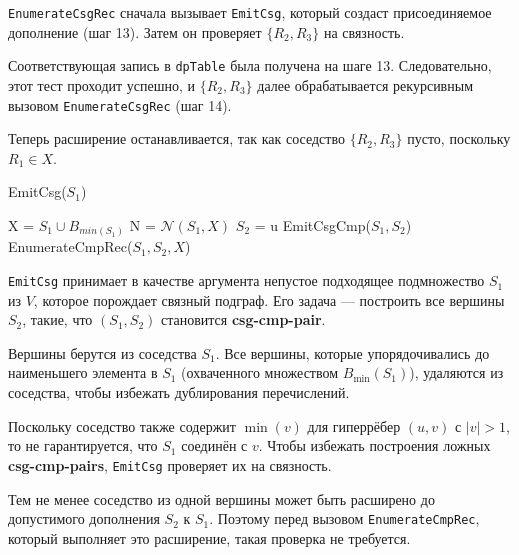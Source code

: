 \documentclass[12pt]{article}
\begin{document}
\begin{flushleft}
\texttt{EnumerateCsgRec} сначала вызывает \texttt{EmitCsg},  
который создаст присоединяемое дополнение (шаг 13).  
Затем он проверяет $\{R_2, R_3\}$ на связность.  

Соответствующая запись в \texttt{dpTable} была получена на шаге 13.  
Следовательно, этот тест проходит успешно,  
и $\{R_2, R_3\}$ далее обрабатывается рекурсивным вызовом  
\texttt{EnumerateCsgRec} (шаг 14).  

Теперь расширение останавливается, так как соседство $\{R_2, R_3\}$ пусто,  
поскольку $R_1 \in X$.  

\begin{algorithm}
    EmitCsg($S_1$)
    \begin{algorithmic}[1]
        \State X = $S_1 \cup B_{min(S_1)}$
        \State N = $\mathcal{N}(S_1, X)$
            \State $S_2$ = {u}
                \State EmitCsgCmp($S_1, S_2$)
            \EndIf
            \State EnumerateCmpRec($S_1,S_2,X$)
        \EndFor
    \end{algorithmic}
\end{algorithm}

\texttt{EmitCsg} принимает в качестве аргумента непустое подходящее подмножество $S_1$ из $V$,  
которое порождает связный подграф.  
Его задача — построить все вершины $S_2$, такие,  
что $(S_1, S_2)$ становится \textbf{csg-cmp-pair}.  

Вершины берутся из соседства $S_1$.  
Все вершины, которые упорядочивались до наименьшего элемента в $S_1$  
(охваченного множеством $B_{\min}(S_1)$), удаляются из соседства,  
чтобы избежать дублирования перечислений.  

Поскольку соседство также содержит $\min(v)$  
для гиперрёбер $(u, v)$ с $|v| > 1$,  
то не гарантируется, что $S_1$ соединён с $v$.  
Чтобы избежать построения ложных \textbf{csg-cmp-pairs},  
\texttt{EmitCsg} проверяет их на связность.  

Тем не менее соседство из одной вершины может быть расширено  
до допустимого дополнения $S_2$ к $S_1$.  
Поэтому перед вызовом \texttt{EnumerateCmpRec},  
который выполняет это расширение, такая проверка не требуется.  

\begin{center}
\end{center}
\end{flushleft}
\end{document}
